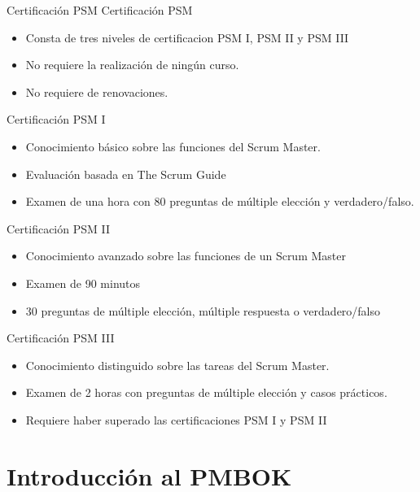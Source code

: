 \begin{frame}[allowframebreaks]{Certificación PSM}
	Certificación PSM 

	\begin{itemize}
		\item Consta de tres niveles de certificacion PSM I, PSM II y PSM III
		\item No requiere la realización de ningún curso.
		\item No requiere de renovaciones.
	\end{itemize}

	\framebreak

	Certificación PSM I
	\begin{itemize}
		\item Conocimiento básico sobre las funciones del Scrum Master.
		\item Evaluación basada en The Scrum Guide
		\item Examen de una hora con 80 preguntas de múltiple elección y verdadero/falso.
	\end{itemize}

	\framebreak

	Certificación PSM II
	\begin{itemize}
		\item Conocimiento avanzado sobre las funciones de un Scrum Master
		\item Examen de 90 minutos
		\item 30 preguntas de múltiple elección, múltiple respuesta o verdadero/falso
	\end{itemize}

	\framebreak

	Certificación PSM III
	\begin{itemize}
		\item Conocimiento distinguido sobre las tareas del Scrum Master.
		\item Examen de 2 horas con preguntas de múltiple elección y casos prácticos.
		\item Requiere haber superado las certificaciones PSM I y PSM II
	\end{itemize}


\end{frame}


\section{Introducción al PMBOK}

